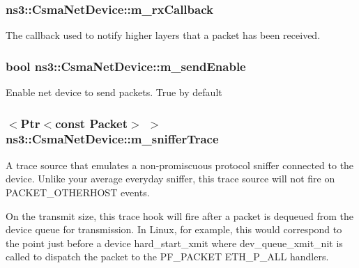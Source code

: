\subsubsection[{\texorpdfstring{m\+\_\+rx\+Callback}{m_rxCallback}}]{ ns3\+::\+Csma\+Net\+Device\+::m\+\_\+rx\+Callback\hspace{0.3cm}{\ttfamily [private]}}\hypertarget{classns3_1_1CsmaNetDevice_a18646390c167ad8f0f8b8795a9052031}{}\label{classns3_1_1CsmaNetDevice_a18646390c167ad8f0f8b8795a9052031}
The callback used to notify higher layers that a packet has been received. 
\subsubsection[{\texorpdfstring{m\+\_\+send\+Enable}{m_sendEnable}}]{\setlength{\rightskip}{0pt plus 5cm}bool ns3\+::\+Csma\+Net\+Device\+::m\+\_\+send\+Enable\hspace{0.3cm}{\ttfamily [private]}}\hypertarget{classns3_1_1CsmaNetDevice_ac5bde9af7f582a6d707a68061c114fdf}{}\label{classns3_1_1CsmaNetDevice_ac5bde9af7f582a6d707a68061c114fdf}
Enable net device to send packets. True by default 
\subsubsection[{\texorpdfstring{m\+\_\+sniffer\+Trace}{m_snifferTrace}}]{$<${\bf Ptr}$<$const {\bf Packet}$>$ $>$ ns3\+::\+Csma\+Net\+Device\+::m\+\_\+sniffer\+Trace\hspace{0.3cm}{\ttfamily [private]}}\hypertarget{classns3_1_1CsmaNetDevice_a88e5994b762e01f74606742a7f15b797}{}\label{classns3_1_1CsmaNetDevice_a88e5994b762e01f74606742a7f15b797}
A trace source that emulates a non-\/promiscuous protocol sniffer connected to the device. Unlike your average everyday sniffer, this trace source will not fire on P\+A\+C\+K\+E\+T\+\_\+\+O\+T\+H\+E\+R\+H\+O\+ST events.

On the transmit size, this trace hook will fire after a packet is dequeued from the device queue for transmission. In Linux, for example, this would correspond to the point just before a device hard\+\_\+start\+\_\+xmit where dev\+\_\+queue\+\_\+xmit\+\_\+nit is called to dispatch the packet to the P\+F\+\_\+\+P\+A\+C\+K\+ET E\+T\+H\+\_\+\+P\+\_\+\+A\+LL handlers.

